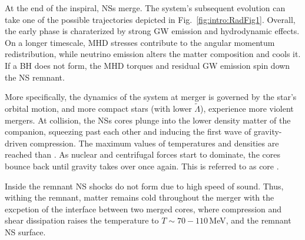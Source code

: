 At the end of the inspiral, \acp{NS} merge. 
The system's subsequent evolution can take one of the possible trajectories 
depicted in Fig.~\ref{fig:intro:RadFig1}. Overall, the early \pmerg{} phase is 
charaterized by strong \ac{GW} emission and hydrodynamic effects. 
On a longer timescale, \ac{MHD} stresses contribute to the angular momentum redistribution, 
while neutrino emission alters the matter composition and cools it.
%
If a \ac{BH} does not form, the \ac{MHD} torques and residual \ac{GW} 
emission spin down the \ac{NS} remnant. 


More specifically, the dynamics of the system at merger is governed by the star's 
orbital motion, and more compact stars (with lower $\tilde{\Lambda}$), 
experience more violent mergers. 
%
At collision, the \acp{NS} cores plunge into the lower density matter of the companion, 
squeezing past each other and inducing the first wave of gravity-driven compression. 
The maximum values of temperatures and densities are reached than \citep{Perego:2019adq}. 
As nuclear and centrifugal forces start to dominate, the cores bounce back until gravity 
takes over once again. This is referred to as core \bnc{} \citep[\eg][]{Radice:2018pdn}. 
%

Inside the remnant \ac{NS} shocks do not form due to high speed of sound. Thus, 
withing the remnant, matter remains cold throughout the merger with 
the excpetion of the interface between 
two merged cores, where compression and shear dissipation raises the temperature 
to $T\sim70-110\,$MeV, and the remnant \ac{NS} surface.
%


